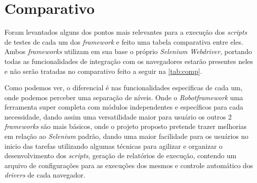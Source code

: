     \section{Comparativo}

    Foram levantados alguns dos pontos mais relevantes para a execução dos \textit{scripts} de testes de cada um dos \textit{framework} e feito uma tabela comparativa entre eles.
    Ambos \textit{frameworks} utilizam em sua base o próprio \textit{Selenium Webdriver}, portando todas as funcionalidades de integração com os navegadores estarão
    presentes neles e não serão tratadas no comparativo feito a seguir na \autoref{tab:comp}.

    
    \vspace*{1cm}

    Como podemos ver, o diferencial é nas funcionalidades especificas de cada um, onde podemos perceber uma separação de níveis. Onde o \textit{Robotframework} uma ferramenta super
    completa com módulos independentes e específicos para cada necessidade, dando assim uma versatilidade maior para usuário os outros 2 \textit{frameworks} são
    mais básicos, onde o projeto proposto pretende trazer melhorias em relação ao \textit{Selenium} padrão, dando uma maior facilidade para os usuários no inicio das tarefas utilizando
    algumas técnicas para agilizar e organizar o desenvolvimento dos \textit{scripts}, geração de relatórios de execução, contendo um arquivo de configurações para as execuções dos mesmos e controle
    automático dos \textit{drivers} de cada navegador.

